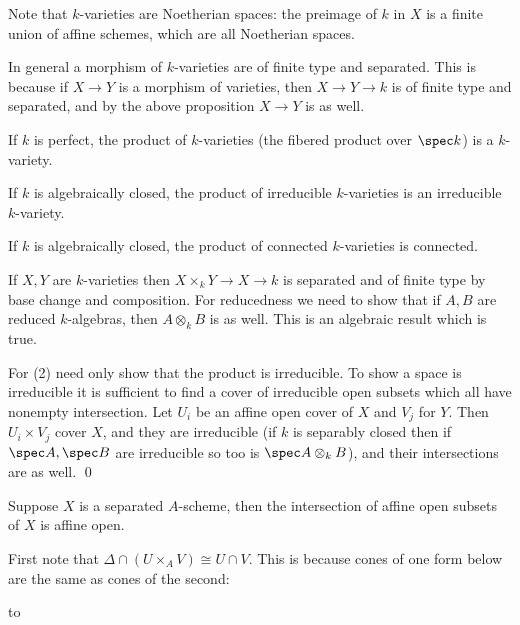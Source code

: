 Note that $k$-varieties are Noetherian spaces: the preimage of $k$ in $X$ is a finite union of affine schemes,
which are all Noetherian spaces.

In general a morphism of $k$-varieties are of finite type and separated.
This is because if $X\to Y$ is a morphism of varieties, then $X\to Y\to k$ is of finite type and separated,
and by the above proposition $X\to Y$ is as well.

\bprop

    \benum
        \item If $k$ is perfect, the product of $k$-varieties (the fibered product over $\spec k$) is a
        $k$-variety.
        \item If $k$ is algebraically closed, the product of irreducible $k$-varieties is an irreducible
        $k$-variety.
        \item If $k$ is algebraically closed, the product of connected $k$-varieties is connected.
    \eenum

\eprop

\bproof

    If $X,Y$ are $k$-varieties then $X\times_kY\to X\to k$ is separated and of finite type by base change
    and composition.
    For reducedness we need to show that if $A,B$ are reduced $k$-algebras, then $A\otimes_kB$
    is as well.
    This is an algebraic result which is true.

    For (2) need only show that the product is irreducible.
    To show a space is irreducible it is sufficient to find a cover of irreducible open subsets which all
    have nonempty intersection.
    Let $U_i$ be an affine open cover of $X$ and $V_j$ for $Y$.
    Then $U_i\times V_j$ cover $X$, and they are irreducible (if $k$ is separably closed then if
    $\spec A,\spec B$ are irreducible so too is $\spec A\otimes_kB$), and their intersections are as well.
    \qed

\eproof

\bprop

    Suppose $X$ is a separated $A$-scheme, then the intersection of affine open subsets of $X$ is affine open.

\eprop

\bproof

    First note that $\Delta\cap(U\times_AV)\cong U\cap V$.
    This is because cones of one form below are the same as cones of the second:

    \medskip
    \hbox to
    \medskip


